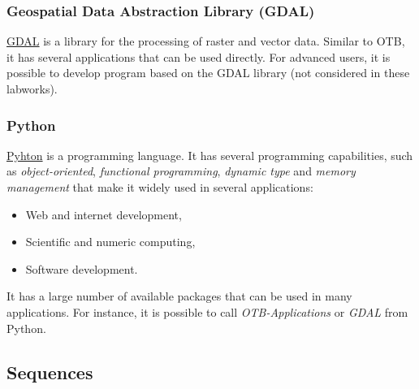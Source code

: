 \documentclass[a4paper,11pt,DIV=18]{scrartcl}
\begin{document}
\subsubsection{Geospatial Data Abstraction Library (GDAL)}
\label{sec:org75d74ae}
\href{http://www.gdal.org/}{GDAL}  is   a  library  for   the  processing  of  raster   and  vector
data. Similar  to OTB, it  has several  applications that can  be used
directly. For advanced users, it  is possible to develop program based
on the GDAL library (not considered in these labworks).

\subsubsection{Python}
\label{sec:org0054c1e}
\href{https://www.python.org/}{Pyhton}  is   a  programming  language.  It   has  several  programming
capabilities, such as \emph{object-oriented}, \emph{functional programming}, \emph{dynamic
type}  and  \emph{memory management}  that  make  it  widely used  in  several
applications:
\begin{itemize}
\item Web and internet development,
\item Scientific and numeric computing,
\item Software development.
\end{itemize}
It has a large  number of available packages that can  be used in many
applications. For instance, it is possible to call \emph{OTB-Applications} or
\emph{GDAL} from Python.
\subsection{Sequences}
\label{sec:orge4158ca}
\end{document}
